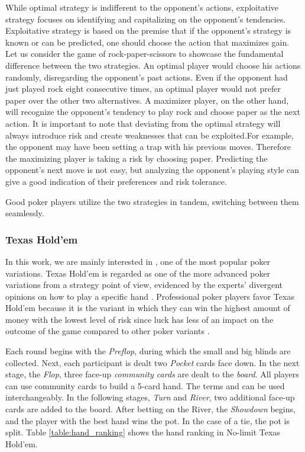 While optimal strategy is indifferent to the opponent's actions, exploitative strategy focuses on identifying and capitalizing on the opponent's tendencies. Exploitative strategy is based on the premise that if the opponent's strategy is known or can be predicted, one should choose the action that maximizes gain. Let us consider the game of rock-paper-scissors to showcase the fundamental difference between the two strategies. An optimal player would choose his actions randomly, disregarding the opponent's past actions. Even if the opponent had just played rock eight consecutive times, an optimal player would not prefer paper over the other two alternatives. A maximizer player, on the other hand, will recognize the opponent's tendency to play rock and choose paper as the next action. It is important to note that deviating from the optimal strategy will always introduce risk and create weaknesses that can be exploited.For example, the opponent may have been setting a trap with his previous moves. Therefore the maximizing player is taking a risk by choosing paper. Predicting the opponent's next move is not easy, but analyzing the opponent's playing style can give a good indication of their preferences and risk tolerance.

Good poker players utilize the two strategies in tandem, switching between them seamlessly.


\subsubsection{Texas Hold'em}

In this work, we are mainly interested in , one of the most popular poker variations. Texas Hold'em is regarded as one of the more advanced poker variations from a strategy point of view, evidenced by the experts' divergent opinions on how to play a specific hand \cite{sklansky_2003}. Professional poker players favor Texas Hold'em because it is the variant in which they can win the highest amount of money with the lowest level of risk since luck has less of an impact on the outcome of the game compared to other poker variants \cite{malmuth_2004}.

Each round begins with the \textit{Preflop}, during which the small and big blinds are collected. Next, each participant is dealt two \textit{Pocket} cards face down. In the next stage, the \textit{Flop}, three face-up \textit{community cards} are dealt to the \textit{board}. All players can use community cards to build a 5-card hand. The terms  and  can be used interchangeably. In the following stages, \textit{Turn} and \textit{River}, two additional face-up cards are added to the board. After betting on the River, the \textit{Showdown} begins, and the player with the best hand wins the pot. In the case of a tie, the pot is split. Table \ref{table:hand_ranking} shows the hand ranking in No-limit Texas Hold'em.

